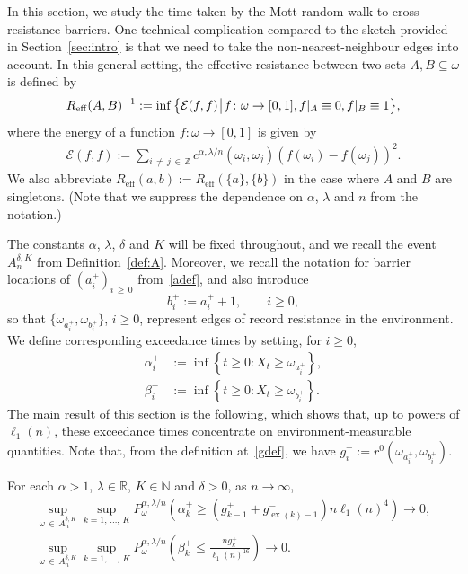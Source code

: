 \documentclass[AHL,Unicode,longabstracts,published]{cedram}
\newcommand{\N}{\mathbb N}
\newcommand{\Z}{\mathbb Z}
\newcommand{\R}{\mathbb R}
\newcommand{\clE}{\mathcal{E}}
\newcommand{\eff}{\mathrm{eff}}
\newcommand\ex{\operatorname{ex}}
\newcommand{\gtt}[1]{g_{\ex(#1)-1}^-}
\begin{document}
In this section, we study the time taken by the Mott random walk to cross resistance barriers. One technical complication compared to the sketch provided in Section~\ref{sec:intro} is that we need to take the non-nearest-neighbour edges into account. In this general setting, the effective resistance between two sets $A,B\subseteq\omega$ is defined by
\begin{align}\label{eq:def_Reff}
R_\eff(A,B)^{-1}:=\inf\big\{\clE(f,f)\:\vline\:f\colon\omega\to[0,1],f|_A\equiv 0,f|_B\equiv 1 \big\},
\end{align}
where the energy of a function $f\colon\omega\to[0,1]$ is given by
\begin{align}\label{eq:def_E}
\clE(f,f):=\sum_{i\,\neq\,j\,\in\,\Z}c^{\alpha,\lambda/n}(\omega_i,\omega_j)(f(\omega_i)-f(\omega_j))^2.
\end{align}
We also abbreviate $R_\eff(a,b):=R_\eff(\{a\},\{b\})$ in the case where $A$ and $B$ are singletons. (Note that we suppress the dependence on $\alpha$, $\lambda$ and $n$ from the notation.)

The constants $\alpha$, $\lambda$, $\delta$ and $K$ will be fixed throughout, and we recall the event $A_{n}^{\delta,K}$ from Definition~\ref{def:A}. Moreover, we recall the notation for barrier locations of $(a_i^+)_{i\,\geq\,0}$ from~\eqref{adef}, and also introduce
\[
b_i^+:=a_i^++1,\qquad i\geq 0,
\]
so that $\{\omega_{a_i^+},\omega_{b_i^+}\}$, $i\geq0$, represent edges of record resistance in the environment. We define corresponding exceedance times by setting, for $i\geq 0$,
\begin{align}
\alpha_i^+&:=\inf\left\{t\geq 0:X_t\geq \omega_{a_i^+}\right\},\label{eq:alphadef}
\\
\beta_i^+&:=\inf\left\{t\geq 0:X_t\geq \omega_{b_i^+}\right\}.\label{eq:betadef}
\end{align}
The main result of this section is the following, which shows that, up to powers of $\ell_1(n)$, these exceedance times concentrate on environment-measurable quantities. Note that, from the definition at~\eqref{gdef}, we have $g_i^+:=r^0(\omega_{a_i^+},\omega_{b_i^+})$.

\begin{theo}\label{thm:annealed}
For each $\alpha>1$, $\lambda\in\R$, $K\in \N$ and $\delta>0$, as $n\rightarrow\infty$,
\begin{align}
\sup_{\omega\,\in\,A_n^{\delta,K}}\sup_{k=1,\,\dots,\,K} P_\omega^{\alpha,\lambda/n}\left(\alpha_k^+\geq \left(g_{k-1}^++\gtt{k}\right) n\ell_1(n)^4\right)\rightarrow0,\label{eq:not_too_fast}
\\
\sup_{\omega\,\in\,A_n^{\delta,K}}\sup_{k=1,\,\dots,\,K} P_\omega^{\alpha,\lambda/n}\left(\beta_k^+\leq \frac{ng_k^+}{\ell_1(n)^{16}}\right)\rightarrow0.\label{eq:not_too_slow}
\end{align}
\end{theo}
\end{document}
